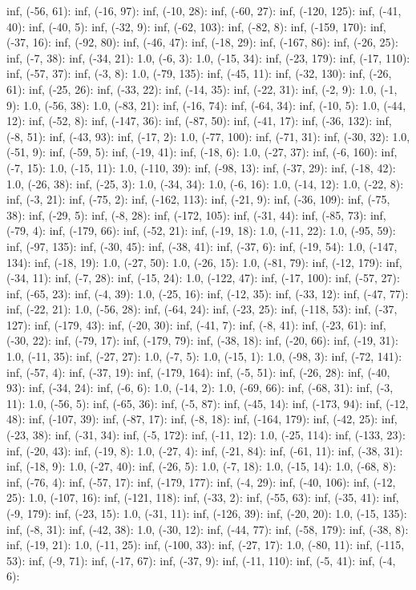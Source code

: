 \documentclass[parskip=half]{scrartcl}
\begin{document}
inf, (-56, 61): inf, (-16, 97): inf, (-10, 28): inf, (-60, 27): inf, (-120, 125): inf, (-41, 40): inf, (-40, 5): inf, (-32, 9): inf, (-62, 103): inf, (-82, 8): inf, (-159, 170): inf, (-37, 16): inf, (-92, 80): inf, (-46, 47): inf, (-18, 29): inf, (-167, 86): inf, (-26, 25): inf, (-7, 38): inf, (-34, 21): 1.0, (-6, 3): 1.0, (-15, 34): inf, (-23, 179): inf, (-17, 110): inf, (-57, 37): inf, (-3, 8): 1.0, (-79, 135): inf, (-45, 11): inf, (-32, 130): inf, (-26, 61): inf, (-25, 26): inf, (-33, 22): inf, (-14, 35): inf, (-22, 31): inf, (-2, 9): 1.0, (-1, 9): 1.0, (-56, 38): 1.0, (-83, 21): inf, (-16, 74): inf, (-64, 34): inf, (-10, 5): 1.0, (-44, 12): inf, (-52, 8): inf, (-147, 36): inf, (-87, 50): inf, (-41, 17): inf, (-36, 132): inf, (-8, 51): inf, (-43, 93): inf, (-17, 2): 1.0, (-77, 100): inf, (-71, 31): inf, (-30, 32): 1.0, (-51, 9): inf, (-59, 5): inf, (-19, 41): inf, (-18, 6): 1.0, (-27, 37): inf, (-6, 160): inf, (-7, 15): 1.0, (-15, 11): 1.0, (-110, 39): inf, (-98, 13): inf, (-37, 29): inf, (-18, 42): 1.0, (-26, 38): inf, (-25, 3): 1.0, (-34, 34): 1.0, (-6, 16): 1.0, (-14, 12): 1.0, (-22, 8): inf, (-3, 21): inf, (-75, 2): inf, (-162, 113): inf, (-21, 9): inf, (-36, 109): inf, (-75, 38): inf, (-29, 5): inf, (-8, 28): inf, (-172, 105): inf, (-31, 44): inf, (-85, 73): inf, (-79, 4): inf, (-179, 66): inf, (-52, 21): inf, (-19, 18): 1.0, (-11, 22): 1.0, (-95, 59): inf, (-97, 135): inf, (-30, 45): inf, (-38, 41): inf, (-37, 6): inf, (-19, 54): 1.0, (-147, 134): inf, (-18, 19): 1.0, (-27, 50): 1.0, (-26, 15): 1.0, (-81, 79): inf, (-12, 179): inf, (-34, 11): inf, (-7, 28): inf, (-15, 24): 1.0, (-122, 47): inf, (-17, 100): inf, (-57, 27): inf, (-65, 23): inf, (-4, 39): 1.0, (-25, 16): inf, (-12, 35): inf, (-33, 12): inf, (-47, 77): inf, (-22, 21): 1.0, (-56, 28): inf, (-64, 24): inf, (-23, 25): inf, (-118, 53): inf, (-37, 127): inf, (-179, 43): inf, (-20, 30): inf, (-41, 7): inf, (-8, 41): inf, (-23, 61): inf, (-30, 22): inf, (-79, 17): inf, (-179, 79): inf, (-38, 18): inf, (-20, 66): inf, (-19, 31): 1.0, (-11, 35): inf, (-27, 27): 1.0, (-7, 5): 1.0, (-15, 1): 1.0, (-98, 3): inf, (-72, 141): inf, (-57, 4): inf, (-37, 19): inf, (-179, 164): inf, (-5, 51): inf, (-26, 28): inf, (-40, 93): inf, (-34, 24): inf, (-6, 6): 1.0, (-14, 2): 1.0, (-69, 66): inf, (-68, 31): inf, (-3, 11): 1.0, (-56, 5): inf, (-65, 36): inf, (-5, 87): inf, (-45, 14): inf, (-173, 94): inf, (-12, 48): inf, (-107, 39): inf, (-87, 17): inf, (-8, 18): inf, (-164, 179): inf, (-42, 25): inf, (-23, 38): inf, (-31, 34): inf, (-5, 172): inf, (-11, 12): 1.0, (-25, 114): inf, (-133, 23): inf, (-20, 43): inf, (-19, 8): 1.0, (-27, 4): inf, (-21, 84): inf, (-61, 11): inf, (-38, 31): inf, (-18, 9): 1.0, (-27, 40): inf, (-26, 5): 1.0, (-7, 18): 1.0, (-15, 14): 1.0, (-68, 8): inf, (-76, 4): inf, (-57, 17): inf, (-179, 177): inf, (-4, 29): inf, (-40, 106): inf, (-12, 25): 1.0, (-107, 16): inf, (-121, 118): inf, (-33, 2): inf, (-55, 63): inf, (-35, 41): inf, (-9, 179): inf, (-23, 15): 1.0, (-31, 11): inf, (-126, 39): inf, (-20, 20): 1.0, (-15, 135): inf, (-8, 31): inf, (-42, 38): 1.0, (-30, 12): inf, (-44, 77): inf, (-58, 179): inf, (-38, 8): inf, (-19, 21): 1.0, (-11, 25): inf, (-100, 33): inf, (-27, 17): 1.0, (-80, 11): inf, (-115, 53): inf, (-9, 71): inf, (-17, 67): inf, (-37, 9): inf, (-11, 110): inf, (-5, 41): inf, (-4, 6): 
\end{document}
